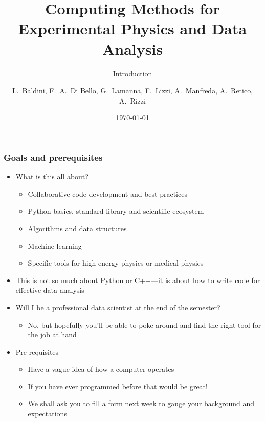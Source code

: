 \documentclass[9pt]{beamer}
\title{\scriptsize Computing Methods for Experimental Physics and Data Analysis}
\subtitle{Introduction}
\date{\today}
\author{L.~Baldini, F.~A.~Di Bello, G.~Lamanna, F.~Lizzi, A.~Manfreda, A.~Retico, A.~Rizzi}
\institute[UNIPI and INFN]{Universit\`a and INFN--Pisa}
\begin{document}
\titleframe

\begin{frame}
  \frametitle{Goals and prerequisites}
  \begin{itemize}
  \item What is this all about?
    \begin{itemize}
    \item Collaborative code development and best practices
    \item Python basics, standard library and scientific ecosystem
    \item Algorithms and data structures
    \item Machine learning
    \item Specific tools for high-energy physics or medical physics
    \end{itemize}
  \item \alert{This is not so much about Python or C++---it is about how to
    write code for effective data analysis}
  \item Will I be a professional data scientist at the end of the semester?
    \begin{itemize}
    \item No, but hopefully you'll be able to poke around and find the right
      tool for the job at hand
    \end{itemize}
  \item Pre-requisites
    \begin{itemize}
    \item Have a vague idea of how a computer operates
    \item If you have ever programmed before that would be great!
    \item \alert{We shall ask you to fill a form next week to gauge your
      background and expectations}
    \end{itemize}
  \end{itemize}
\end{frame}
\end{document}
